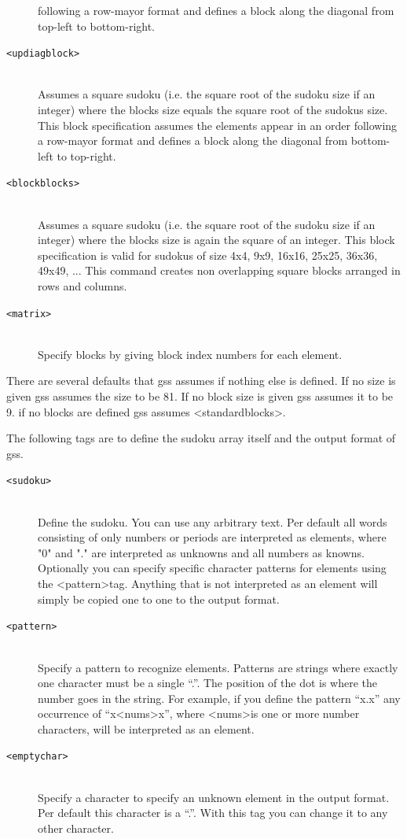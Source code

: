 \documentclass[12pt]{article}
\begin{document}
\begin{description}
following a row-mayor format and defines a block along the diagonal from 
top-left to bottom-right. 
\item [\texttt{<updiagblock>}] \hfill \\ Assumes a square sudoku (i.e. the square root of the sudoku size if an 
integer) where the blocks size equals the square root of the sudokus 
size. This block specification assumes the elements appear in an order 
following a row-mayor format and defines a block along the diagonal from 
bottom-left to top-right. 
\item [\texttt{<blockblocks>}] \hfill \\ Assumes a square sudoku (i.e. the square root of the sudoku size if an 
integer) where the blocks size is again the square of an integer. 
This block specification is valid for sudokus of size 4x4, 9x9, 16x16, 
25x25, 36x36, 49x49, ... This command creates non overlapping square 
blocks arranged in rows and columns.
\item [\texttt{<matrix>}] \hfill \\ Specify blocks by giving block index numbers for each element.
\end{description}

There are several defaults that gss assumes if nothing else is defined. If no size is given gss assumes the size to be 81. If no block size is given gss assumes it to be 9. if no blocks are defined gss assumes \textless standardblocks\textgreater.

The following tags are to define the sudoku array itself and the output format of gss.
\begin{description}
\item [\texttt{<sudoku>}] \hfill \\ Define the sudoku. You can use any arbitrary text. Per default all words consisting of only numbers or periods are interpreted as elements, where "0" and "." are interpreted as unknowns and all numbers as knowns. Optionally you can specify specific character patterns for elements using the \textless pattern\textgreater  tag. Anything that is not interpreted as an element will simply be copied one to one to the output format. 
\item [\texttt{<pattern>}] \hfill \\ Specify a pattern to recognize elements. Patterns are strings where exactly one character must be a single ``.''. The position of the dot is where the number goes in the string. For example, if you define the pattern ``x.x'' any occurrence of 	``x\textless nums\textgreater x'', where \textless nums\textgreater  is one or more number characters, will be interpreted as an element.
\item [\texttt{<emptychar>}] \hfill \\ Specify a character to specify an unknown element in the output format. Per default this character is a ``.''. With this tag you can change it to any other character.
\end{description}
\end{document}
